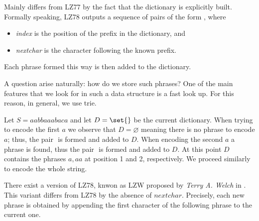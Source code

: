 \documentclass{subfiles}
\begin{document}
    Mainly differs from LZ77 by the fact that the dictionary is explicitly built.
    Formally speaking, LZ78 outputs a sequence of pairs of the form \(<index, nextchar>\),
    where 
    \begin{itemize}
        \item \emph{index} is the position of the prefix in the dictionary, and 
        \item \emph{nextchar} is the character following the known prefix.
    \end{itemize}
    Each phrase formed this way is then added to the dictionary.

    A question arise naturally: how do we store such phrases? One of the main features
    that we look for in such a data structure is a fast look up. For this reason,
    in general, we use trie\footnotemark.

    \clearpage
    \begin{example*}
        Let \(S = aabbaaabaca\) and let \(D = \set{ }\) be the current dictionary.
            When trying to encode the first \(a\) we observe that \(D = \varnothing\)
            meaning there is no phrase to encode \(a\); thus, the pair \(<0, a>\)
            is formed and added to \(D\). When encoding the second \(a\) a phrase is found,
            thus the pair \(<1, a>\) is formed and added to \(D\). 
            At this point \(D\) contains the phrases \(a, aa\) at position 1 and 2,
            respectively. We proceed similarly to encode the whole string.
    \end{example*}

    \begin{remark*}
        There exist a version of LZ78, knwon as LZW proposed by \emph{Terry A. Welch} in \cite{welch1984}.
        This variant differs from LZ78 by the absence of \(nextchar\). 
        Precisely, each new phrase is obtained by appending the first character of the following phrase
        to the current one.
    \end{remark*}
\end{document}
